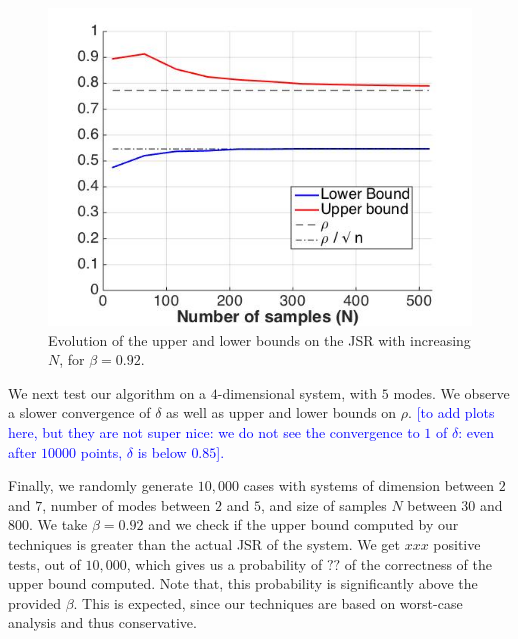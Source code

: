 \begin{figure}
\begin{center}
\includegraphics[trim = 5mm 5mm 5mm 5mm,scale=0.35]{bounds1.jpg}

\caption{Evolution of the upper and lower bounds on the JSR with increasing $N$, for $\beta=0.92$.}
\label{fig:21}
\end{center}
\end{figure}

We next test our algorithm on a $4$-dimensional system, with $5$ modes. We observe a slower convergence of $\delta$ as well as upper and lower bounds on $\rho$.
\textcolor{blue}{[to add plots here, but they are not super nice: we do not see the convergence to $1$ of $\delta$: even after $10 000$ points, $\delta$ is below $0.85$].}

Finally, we randomly generate $10,000$ cases with systems of dimension between $2$ and $7$, number of modes between $2$ and $5$, and size of samples $N$ between $30$ and $800$. We take $\beta = 0.92$ and we check if the upper bound computed by our techniques is greater than the actual JSR of the system. We get $xxx$ positive tests, out of $10,000$, which gives us a probability of $??$ of the correctness of the upper bound computed. Note that, this probability is significantly above the provided $\beta$. This is expected, since our techniques are based on worst-case analysis and thus conservative.



